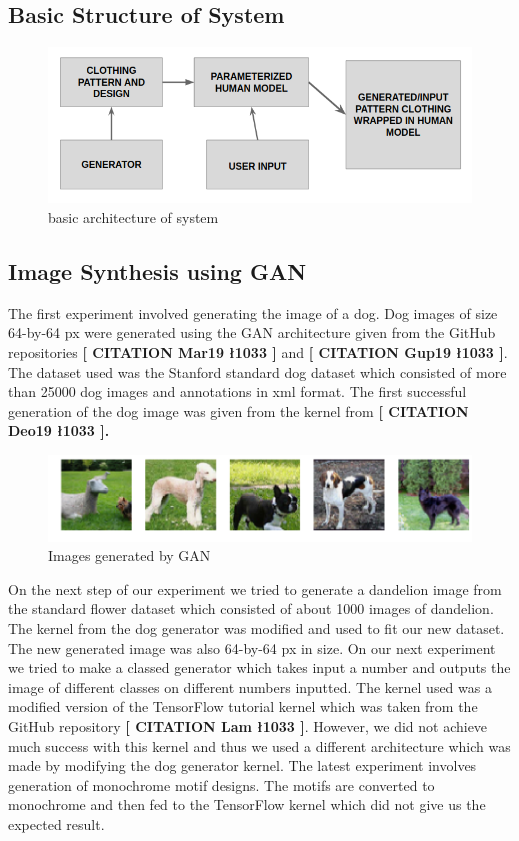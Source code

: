 \documentclass{article}
\begin{document}
    \subsection{Basic Structure of System}
        \begin{figure}[h]
            \centering
            \includegraphics[scale=0.75]{images/basicArchitecture.png}
            \caption{basic architecture of system}
        \end{figure}
     
    
    \subsection{Image Synthesis using GAN}
    
    The first experiment involved generating the image of a dog. Dog images of size 64-by-64 px were generated using the GAN architecture given from the GitHub repositories \textbf{[ CITATION Mar19 \l 1033 ]} and \textbf{[ CITATION Gup19 \l 1033 ]}. The dataset used was the Stanford standard dog dataset which consisted of more than 25000 dog images and annotations in xml format. The first successful generation of the dog image was given from the kernel from \textbf{[ CITATION Deo19 \l 1033 ].}
    
    \begin{figure}[h]
        \centering
        \includegraphics[scale=0.5]{images/dogGAN.png}
        \caption{Images generated by GAN}
    \end{figure}
    On the next step of our experiment we tried to generate a dandelion image from the standard flower dataset which consisted of about 1000 images of dandelion. The kernel from the dog generator was modified and used to fit our new dataset. The new generated image was also 64-by-64 px in size.
    On our next experiment we tried to make a classed generator which takes input a number and outputs the image of different classes on different numbers inputted. The kernel used was a modified version of the TensorFlow tutorial kernel which was taken from the GitHub repository \textbf{[ CITATION Lam \l 1033 ]}. However, we did not achieve much success with this kernel and thus we used a different architecture which was made by modifying the dog generator kernel.
    The latest experiment involves generation of monochrome motif designs. The motifs are converted to monochrome and then fed to the TensorFlow kernel which did not give us the expected result.
    
\end{document}
